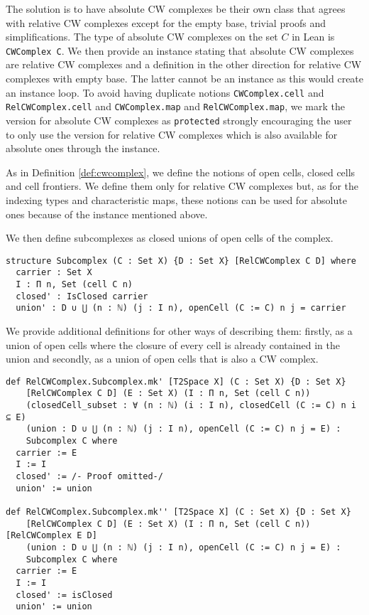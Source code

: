 The solution is to have absolute CW complexes be their own class that agrees with relative CW complexes except for the empty base, trivial proofs and simplifications. 
The type of absolute CW complexes on the set $C$ in Lean is \lstinline|CWComplex C|. 
We then provide an instance stating that absolute CW complexes are relative CW complexes and a definition in the other direction for relative CW complexes with empty base.
The latter cannot be an instance as this would create an instance loop. 
To avoid having duplicate notions \lstinline|CWComplex.cell| and \lstinline|RelCWComplex.cell| and \lstinline|CWComplex.map| and \lstinline|RelCWComplex.map|, we mark the version for absolute CW complexes as \lstinline|protected| strongly encouraging the user to only use the version for relative CW complexes which is also available for absolute ones through the instance.

As in Definition \ref{def:cwcomplex}, we define the notions of open cells, closed cells and cell frontiers.
We define them only for relative CW complexes but, as for the indexing types and characteristic maps, these notions can be used for absolute ones because of the instance mentioned above. 

We then define subcomplexes as closed unions of open cells of the complex.

\begin{lstlisting}[frame=single]
structure Subcomplex (C : Set X) {D : Set X} [RelCWComplex C D] where
  carrier : Set X
  I : Π n, Set (cell C n)
  closed' : IsClosed carrier
  union' : D ∪ ⋃ (n : ℕ) (j : I n), openCell (C := C) n j = carrier
\end{lstlisting}

We provide additional definitions for other ways of describing them: firstly, as a union of open cells where the closure of every cell is already contained in the union and secondly, as a union of open cells that is also a CW complex.

\begin{lstlisting}[frame=single]
def RelCWComplex.Subcomplex.mk' [T2Space X] (C : Set X) {D : Set X} 
    [RelCWComplex C D] (E : Set X) (I : Π n, Set (cell C n))
    (closedCell_subset : ∀ (n : ℕ) (i : I n), closedCell (C := C) n i ⊆ E)
    (union : D ∪ ⋃ (n : ℕ) (j : I n), openCell (C := C) n j = E) : 
    Subcomplex C where
  carrier := E
  I := I
  closed' := /- Proof omitted-/
  union' := union

def RelCWComplex.Subcomplex.mk'' [T2Space X] (C : Set X) {D : Set X} 
    [RelCWComplex C D] (E : Set X) (I : Π n, Set (cell C n)) [RelCWComplex E D]
    (union : D ∪ ⋃ (n : ℕ) (j : I n), openCell (C := C) n j = E) : 
    Subcomplex C where
  carrier := E
  I := I
  closed' := isClosed
  union' := union
\end{lstlisting}

